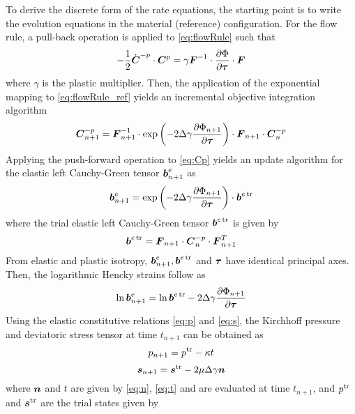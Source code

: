 To derive the discrete form of the rate equations, the starting point 
is to write the evolution equations in the material (reference) 
configuration. For the flow rule, a pull-back operation is applied to 
\eqref{eq:flowRule} such that
%
\begin{equation}\label{eq:flowRule_ref}
-\frac{1}{2}\dot{{\boldsymbol{C}}}^{-p}\cdot{\boldsymbol{C}}^p 
= \gamma{\boldsymbol{F}}^{-1} \cdot \frac{\partial\Phi}{\partial{\boldsymbol{\tau}}} \cdot {\boldsymbol{F}}
\end{equation}
%
where $\gamma$ is the plastic multiplier. Then, the application of the 
exponential mapping to \eqref{eq:flowRule_ref} yields an incremental 
objective integration algorithm
%
\begin{equation}\label{eq:Cp}
{\boldsymbol{C}}_{n+1}^{-p} = {\boldsymbol{F}}_{n+1}^{-1} \cdot \exp\left( -2\Delta\gamma
\frac{\partial\Phi_{n+1}}{\partial{\boldsymbol{\tau}}}\right) \cdot {\boldsymbol{F}}_{n+1} 
\cdot {\boldsymbol{C}}_{n}^{-p}
\end{equation}
%
Applying the push-forward operation to \eqref{eq:Cp} yields an update
algorithm for the elastic left Cauchy-Green tensor ${\boldsymbol{b}}_{n+1}^e$ as
%
\begin{equation}\label{eq:be_n}
{\boldsymbol{b}}_{n+1}^e = \exp\left( -2\Delta\gamma\frac{\partial\Phi_{n+1}}
{\partial{\boldsymbol{\tau}}}\right)\cdot{\boldsymbol{b}}^{e\operatorname{\text{tr}}}
\end{equation}
%
where the trial elastic left Cauchy-Green tensor ${\boldsymbol{b}}^{e\operatorname{\text{tr}}}$ is given 
by
%
\begin{equation}\label{eq:betr}
{\boldsymbol{b}}^{e\operatorname{\text{tr}}} = {\boldsymbol{F}}_{n+1}\cdot{\boldsymbol{C}}_{n}^{-p}\cdot{\boldsymbol{F}}^T_{n+1}
\end{equation}
%
From elastic and plastic isotropy, ${\boldsymbol{b}}_{n+1}^e, {\boldsymbol{b}}^{e\operatorname{\text{tr}}}$ and 
${\boldsymbol{\tau}}$ have identical principal axes. Then, the logarithmic Hencky
strains follow as
%
\begin{equation}\label{eq:lnbetr}
\ln{\boldsymbol{b}}_{n+1}^e = \ln{\boldsymbol{b}}^{e\operatorname{\text{tr}}} - 
2\Delta\gamma\frac{\partial\Phi_{n+1}}{\partial{\boldsymbol{\tau}}}
\end{equation}
%
Using the elastic constitutive relations \eqref{eq:p} and 
\eqref{eq:s}, the Kirchhoff pressure and deviatoric stress tensor at 
time $t_{n+1}$ can be obtained as
%
\begin{equation}\label{eq:discrete_p}
p_{n+1} = p^{\operatorname{\text{tr}}} - \kappa t
\end{equation}
%
\begin{equation}\label{eq:discrete_s}
{\boldsymbol{s}}_{n+1} = {\boldsymbol{s}}^{\operatorname{\text{tr}}} - 2\mu\Delta\gamma {\boldsymbol{n}}
\end{equation}
%
where ${\boldsymbol{n}}$ and $t$ are given by \eqref{eq:n}, \eqref{eq:t} and 
are evaluated at time $t_{n+1}$, and $p^{\operatorname{\text{tr}}}$ and ${\boldsymbol{s}}^{\operatorname{\text{tr}}}$ are the 
trial states given by
